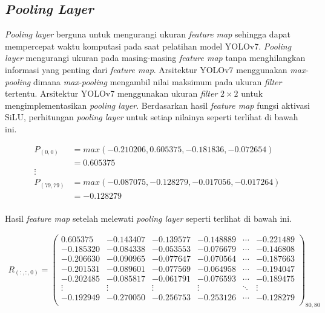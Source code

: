     \subsection{\textit{Pooling Layer}}

    \textit{Pooling layer} berguna untuk mengurangi ukuran \textit{feature map} sehingga dapat mempercepat waktu komputasi pada saat pelatihan model YOLOv7. \textit{Pooling layer} mengurangi ukuran pada masing-masing \textit{feature map} tanpa menghilangkan informasi yang penting dari \textit{feature map}. Arsitektur YOLOv7 menggunakan \textit{max-pooling} dimana \textit{max-pooling} mengambil nilai maksimum pada ukuran \textit{filter} tertentu. Arsitektur YOLOv7 menggunakan ukuran \textit{filter} $2\times 2$ untuk mengimplementasikan \textit{pooling layer}. Berdasarkan hasil \textit{feature map} fungsi aktivasi SiLU, perhitungan \textit{pooling layer} untuk setiap nilainya seperti terlihat di bawah ini.

    \begin{align*}
        P_{(0, 0)}      &= max(-0.210206, 0.605375, -0.181836, -0.072654)\\
                        &= 0.605375 \\
        \vdots \\
        P_{(79, 79)}  &= max(-0.087075, -0.128279, -0.017056, -0.017264)\\
                        &= -0.128279 \\
    \end{align*}

    Hasil \textit{feature map} setelah melewati \textit{pooling layer} seperti terlihat di bawah ini.

    \begin{align*}
        R_{(:, :, 0)} = 
        \begin{pmatrix}
            0.605375  & -0.143407 & -0.139577 & -0.148889 & \cdots & -0.221489 \\
            -0.185320 & -0.084338 & -0.053553 & -0.076679 & \cdots & -0.146808 \\
            -0.206630 & -0.090965 & -0.077647 & -0.070564 & \cdots & -0.187663 \\
            -0.201531 & -0.089601 & -0.077569 & -0.064958 & \cdots & -0.194047 \\
            -0.202485 & -0.085817 & -0.061791 & -0.076593 & \cdots & -0.189475 \\
            \vdots    & \vdots    & \vdots    & \vdots    & \ddots & \vdots \\
            -0.192949 & -0.270050 & -0.256753 & -0.253126 & \cdots & -0.128279 \\
        \end{pmatrix}_{80, 80}
    \end{align*}


